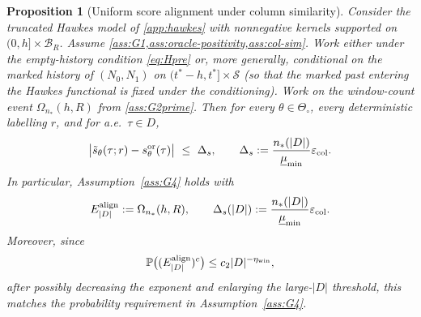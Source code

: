 \documentclass{statsoc}
\newtheorem{proposition}[proposition]{Proposition}
\newcommand{\1}{\mathbbm{1}}
\begin{document}
\begin{proposition}[Uniform score alignment under column similarity]
\label{prop:hawkes-G4}
Consider the truncated Hawkes model of \cref{app:hawkes} with nonnegative kernels supported on
$(0,h]\times \mathcal B_R$.
Assume \cref{ass:G1,ass:oracle-positivity,ass:col-sim}.
Work either under the empty-history condition \eqref{eq:Hpre} or, more generally, conditional on the
marked history of $(N_0,N_1)$ on $(t^\ast-h,t^\ast]\times\mathcal S$ (so that the marked past entering the Hawkes
functional is fixed under the conditioning).
Work on the window-count event $\Omega_{n_*}(h,R)$ from \cref{ass:G2prime}.
Then for every $\theta\in\Theta_\circ$, every deterministic labelling $r$, and for a.e.\ $\tau\in D$,
\[
\big|\tilde s_\theta(\tau;r)-s^{\rm or}_\theta(\tau)\big|
\ \le\ \Delta_s,
\qquad
\Delta_s := \frac{n_*(|D|)}{\underline\mu_{\min}}\varepsilon_{\rm col}.
\]
In particular, Assumption~\ref{ass:G4} holds with
\[
E^{\rm align}_{|D|}:=\Omega_{n_*}(h,R),
\qquad
\Delta_s(|D|):=\frac{n_*(|D|)}{\underline\mu_{\min}}\varepsilon_{\rm col}.
\]
Moreover, since
\[
\mathbb P\big((E^{\rm align}_{|D|})^c\big)\le c_2|D|^{-\eta_{\rm win}},
\]
after possibly decreasing the exponent and enlarging the large-\(|D|\) threshold, this matches the probability requirement in Assumption~\ref{ass:G4}.
\end{proposition}
\end{document}
